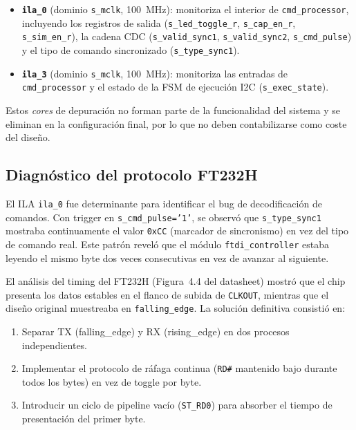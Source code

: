 \documentclass[../main.tex]{subfiles}
\begin{document}
\begin{itemize}
    \item \textbf{\texttt{ila\_0}} (dominio \texttt{s\_mclk}, 100~MHz): monitoriza el interior de \texttt{cmd\_processor}, incluyendo los registros de salida (\texttt{s\_led\_toggle\_r}, \texttt{s\_cap\_en\_r}, \texttt{s\_sim\_en\_r}), la cadena CDC (\texttt{s\_valid\_sync1}, \texttt{s\_valid\_sync2}, \texttt{s\_cmd\_pulse}) y el tipo de comando sincronizado (\texttt{s\_type\_sync1}).
    \item \textbf{\texttt{ila\_3}} (dominio \texttt{s\_mclk}, 100~MHz): monitoriza las entradas de \texttt{cmd\_processor} y el estado de la FSM de ejecución I2C (\texttt{s\_exec\_state}).
\end{itemize}

Estos \textit{cores} de depuración no forman parte de la funcionalidad del sistema y se eliminan en la configuración final, por lo que no deben contabilizarse como coste del diseño.

\subsection{Diagnóstico del protocolo FT232H}

El ILA \texttt{ila\_0} fue determinante para identificar el bug de decodificación de comandos. Con trigger en \texttt{s\_cmd\_pulse='1'}, se observó que \texttt{s\_type\_sync1} mostraba continuamente el valor \texttt{0xCC} (marcador de sincronismo) en vez del tipo de comando real. Este patrón reveló que el módulo \texttt{ftdi\_controller} estaba leyendo el mismo byte dos veces consecutivas en vez de avanzar al siguiente.

El análisis del timing del FT232H (Figura~4.4 del datasheet) mostró que el chip presenta los datos estables en el flanco de subida de \texttt{CLKOUT}, mientras que el diseño original muestreaba en \texttt{falling\_edge}. La solución definitiva consistió en:

\begin{enumerate}
    \item Separar TX (falling\_edge) y RX (rising\_edge) en dos procesos independientes.
    \item Implementar el protocolo de ráfaga continua (\texttt{RD\#} mantenido bajo durante todos los bytes) en vez de toggle por byte.
    \item Introducir un ciclo de pipeline vacío (\texttt{ST\_RD0}) para absorber el tiempo de presentación del primer byte.
\end{enumerate}
\end{document}
